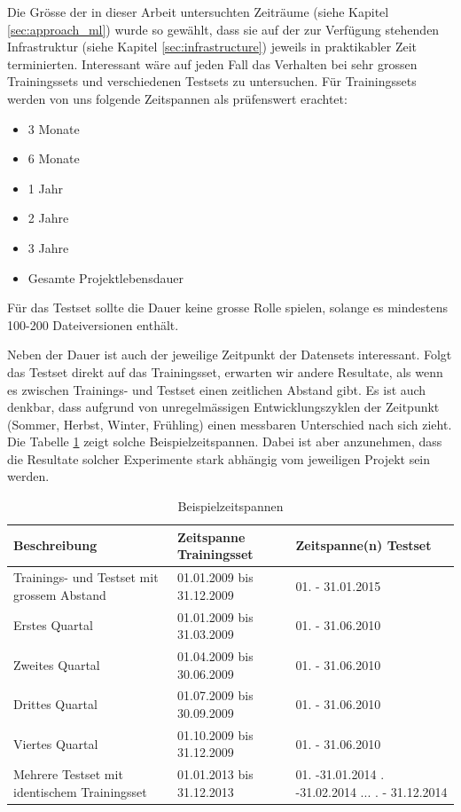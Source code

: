 \documentclass[10pt, a4paper]{article}
\begin{document}
Die Grösse der in dieser Arbeit untersuchten Zeiträume (siehe Kapitel \ref{sec:approach_ml}) wurde so gewählt, dass sie auf der zur Verfügung stehenden Infrastruktur (siehe Kapitel \ref{sec:infrastructure}) jeweils in praktikabler Zeit terminierten. Interessant wäre auf jeden Fall das Verhalten bei sehr grossen Trainingssets und verschiedenen Testsets zu untersuchen. Für Trainingssets werden von uns folgende Zeitspannen als prüfenswert erachtet:
\begin{itemize}
	\item 3 Monate
	\item 6 Monate
	\item 1 Jahr
	\item 2 Jahre
	\item 3 Jahre
	\item Gesamte Projektlebensdauer
\end{itemize}
Für das Testset sollte die Dauer keine grosse Rolle spielen, solange es mindestens 100-200 Dateiversionen enthält.

Neben der Dauer ist auch der jeweilige Zeitpunkt der Datensets interessant. Folgt das Testset direkt auf das Trainingsset, erwarten wir andere Resultate, als wenn es zwischen Trainings- und Testset einen zeitlichen Abstand gibt. Es ist auch denkbar, dass aufgrund von unregelmässigen Entwicklungszyklen der Zeitpunkt (Sommer, Herbst, Winter, Frühling) einen messbaren Unterschied nach sich zieht. Die Tabelle \ref{tab:example_periods} zeigt solche Beispielzeitspannen. Dabei ist aber anzunehmen, dass die Resultate solcher Experimente stark abhängig vom jeweiligen Projekt sein werden.

\begin{table}[H]
	\begin{tabular}{p{5cm}|p{2.5cm}|p{2.5cm}}	
		\textbf{Beschreibung} & \textbf{Zeitspanne Trainingsset} & \textbf{Zeitspanne(n) Testset}\\
		\hline	
		Trainings- und Testset mit grossem Abstand & 01.01.2009 bis 31.12.2009 & 01. - 31.01.2015\\	
		\hline
		Erstes Quartal & 01.01.2009 bis 31.03.2009 & 01. - 31.06.2010\\
		\hline
		Zweites Quartal & 01.04.2009 bis 30.06.2009 & 01. - 31.06.2010\\
		\hline
		Drittes Quartal & 01.07.2009 bis 30.09.2009 & 01. - 31.06.2010\\
		\hline
		Viertes Quartal & 01.10.2009 bis 31.12.2009 & 01. - 31.06.2010\\
		\hline
		Mehrere Testset mit identischem Trainingsset& 01.01.2013 bis 31.12.2013 & 01. -31.01.2014 \newline 01. -31.02.2014 \newline ... \newline 01. - 31.12.2014 \\			
	\end{tabular}
	\caption{Beispielzeitspannen}
	\centering
	\label{tab:example_periods}
\end{table}
\end{document}
